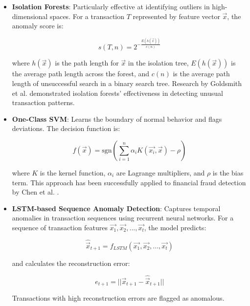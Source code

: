 \documentclass[conference]{IEEEtran}
\begin{document}
\begin{itemize}
    \item \textbf{Isolation Forests}: Particularly effective at identifying outliers in high-dimensional spaces. For a transaction $T$ represented by feature vector $\vec{x}$, the anomaly score is:
    
    \begin{equation}
    s(T, n) = 2^{-\frac{E(h(\vec{x}))}{c(n)}}
    \end{equation}
    
    where $h(\vec{x})$ is the path length for $\vec{x}$ in the isolation tree, $E(h(\vec{x}))$ is the average path length across the forest, and $c(n)$ is the average path length of unsuccessful search in a binary search tree. Research by Goldsmith et al. \cite{goldsmith2019} demonstrated isolation forests' effectiveness in detecting unusual transaction patterns.
    
    \item \textbf{One-Class SVM}: Learns the boundary of normal behavior and flags deviations. The decision function is:
    
    \begin{equation}
    f(\vec{x}) = \text{sgn}\left(\sum_{i=1}^{n} \alpha_i K(\vec{x_i}, \vec{x}) - \rho\right)
    \end{equation}
    
    where $K$ is the kernel function, $\alpha_i$ are Lagrange multipliers, and $\rho$ is the bias term. This approach has been successfully applied to financial fraud detection by Chen et al. \cite{chen2020}.
    
    \item \textbf{LSTM-based Sequence Anomaly Detection}: Captures temporal anomalies in transaction sequences using recurrent neural networks. For a sequence of transaction features $\vec{x_1}, \vec{x_2}, ..., \vec{x_t}$, the model predicts:
    
    \begin{equation}
    \hat{\vec{x}}_{t+1} = f_{LSTM}(\vec{x_1}, \vec{x_2}, ..., \vec{x_t})
    \end{equation}
    
    and calculates the reconstruction error:
    
    \begin{equation}
    e_{t+1} = ||\vec{x}_{t+1} - \hat{\vec{x}}_{t+1}||
    \end{equation}
    
    Transactions with high reconstruction errors are flagged as anomalous.
\end{itemize}
\end{document}
